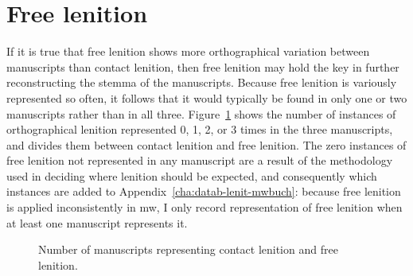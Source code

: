 \section{Free lenition}
\label{sec:points-where-one}
If it is true that free lenition shows more orthographical variation between manuscripts than contact lenition, then free lenition may hold the key in further reconstructing the stemma of the manuscripts. Because free lenition is variously represented so often, it follows that it would typically be found in only one or two manuscripts rather than in all three. Figure~\ref{fig:contfreelendewi} shows the number of instances of orthographical lenition represented 0, 1, 2, or 3 times in the three manuscripts, and divides them between contact lenition and free lenition. The zero instances of free lenition not represented in any manuscript are a result of the methodology used in deciding where lenition should be expected, and consequently which instances are added to Appendix~\ref{cha:datab-lenit-mwbuch}: because free lenition is applied inconsistently in \gls{mw}, I only record representation of free lenition when at least one manuscript represents it.

\begin{figure}[h]
  \centering
  \caption{Number of manuscripts representing contact lenition and free lenition.}
  \label{fig:contfreelendewi}
\end{figure}

%   

